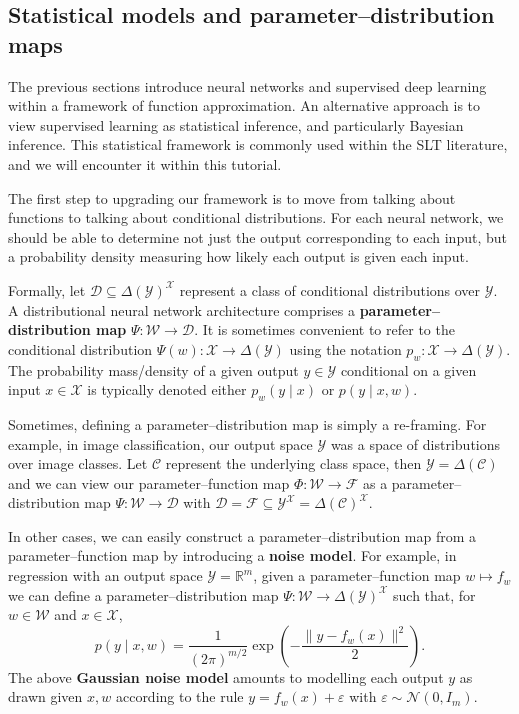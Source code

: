 \documentclass[11pt]{article}
\newcommand{\R}{\mathbb{R}}
\newcommand{\X}{\mathcal{X}}
\newcommand{\Y}{\mathcal{Y}}
\newcommand{\W}{\mathcal{W}}
\newcommand{\F}{\mathcal{F}}
\newcommand{\D}{\mathcal{D}}
\newcommand{\C}{\mathcal{C}}
\begin{document}
\subsection{Statistical models and parameter--distribution maps}
\label{sec:prelims:stats}

The previous sections introduce neural networks and supervised deep learning
within a framework of function approximation. An alternative approach is to
view supervised learning as statistical inference, and particularly Bayesian
inference. This statistical framework is commonly used within the SLT
literature, and we will encounter it within this tutorial.

The first step to upgrading our framework is to move from talking about
functions to talking about conditional distributions. For each neural network,
we should be able to determine not just the output corresponding to each
input, but a probability density measuring how likely each output is given each
input.

Formally, let $\D \subseteq \Delta(\Y)^\X$ represent a class of
conditional distributions over $\Y$.
A distributional neural network architecture comprises a
\textbf{parameter--distribution map}
    $\Psi : \W \to \D$.
It is sometimes convenient to refer to the conditional distribution
    $\Psi(w) : \X \to \Delta(\Y)$
using the notation
    $p_w : \X \to \Delta(\Y)$.
The probability mass/density of a given output $y \in \Y$ conditional on a
given input $x \in \X$ is typically denoted either
    $p_w(y \mid x)$ or $p(y \mid x, w)$.

Sometimes, defining a parameter--distribution map is simply a re-framing. For
example, in image classification, our output space $\Y$ was a space of
distributions over image classes. Let $\C$ represent the underlying class
space, then $\Y = \Delta(\C)$ and we can view our parameter--function map
$\Phi : \W \to \F$ as a parameter--distribution map $\Psi : \W \to \D$ with
    $\D = \F \subseteq \Y^\X = \Delta(\C)^\X$.

In other cases, we can easily construct a parameter--distribution map from a
parameter--function map by introducing a \textbf{noise model}. For example, in
regression with an output space
    $\Y = \R^m$,
given a parameter--function map $w \mapsto f_w$ we can define a
parameter--distribution map
    $\Psi : \W \to \Delta(\Y)^\X$
such that, for $w\in\W$ and $x\in\X$,
\begin{equation}
\label{eq:gaussian-model}
    p(y \mid x, w) = \frac{1}{(2\pi)^{m/2}} 
    \exp\!\left(-\frac{\|y - f_w(x)\|^2}{2}\right).
\end{equation}
The above \textbf{Gaussian noise model} amounts to modelling each output $y$ as
drawn given $x, w$ according to the rule $y = f_w(x) + \varepsilon$ with
$\varepsilon \sim \mathcal{N}(0, I_m)$.
\end{document}
